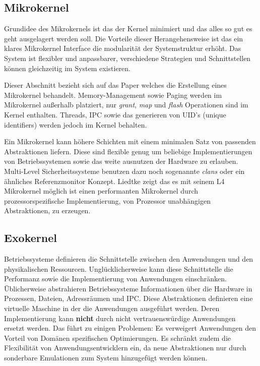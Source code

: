 \documentclass[11pt,technote]{IEEEtran}
\begin{document}
    \subsection{Mikrokernel}
	    Grundidee des Mikrokernels ist das der Kernel minimiert und das alles so gut es geht ausgelagert werden soll.
	    Die Vorteile dieser Herangehensweise ist das ein klares Mikrokernel Interface die modularit\"at der Systemstruktur erh\"oht.
	    Das System ist flexibler und anpassbarer, verschiedene Strategien und Schnittstellen k\"onnen gleichzeitig im System existieren.
	    
	    Dieser Abschnitt bezieht sich auf das Paper \cite{inproc:micro} welches die Erstellung eines Mikrokernel behandelt.
	    Memory-Management sowie Paging werden im Mikrokernel au\ss erhalb platziert, nur \textit{grant}, \textit{map} und \textit{flash} Operationen sind im Kernel 
	    enthalten. \cite[S. 238 f]{inproc:micro} Threads, IPC sowie das generieren von UID's (unique identifiers) werden jedoch im Kernel behalten.
	    
	    Ein Mikrokernel kann h\"ohere Schichten mit einem minimalen Satz von passenden Abstraktionen liefern.
	    Diese sind flexible genug um beliebige Implementierungen von Betriebssystemen sowie das weite ausnutzen der Hardware zu erlauben.
	    Multi-Level Sicherheitssysteme benutzen dazu noch sogenannte \textit{clans} oder ein \"ahnliches Referenzmonitor Konzept.        
	    Liedtke zeigt das es mit seinem L4 Mikrokernel m\"oglich ist einen performanten Mikrokernel durch prozessorspezifische Implementierung, 
	    von Prozessor unabh\"angigen Abstraktionen, zu erzeugen.\cite[S. 248]{inproc:micro}
   
    \subsection{Exokernel}       
      Betriebssysteme definieren die Schnittstelle zwischen den Anwendungen und den physikalischen Ressourcen.
      Ungl\"ucklicherweise kann diese Schnittstelle die Performanz sowie die Implementierung von Anwendungen einschr\"anken. \"Ublicherweise
      abstrahieren Betriebssysteme Informationen \"uber die Hardware in Prozessen, Dateien, Adressr\"aumen und IPC. Diese Abstraktionen definieren eine 
      virtuelle Maschine in der die Anwendungen ausgef\"uhrt werden. Deren Implementierung kann \textbf{nicht} durch nicht vertrauensw\"urdige Anwendungen
      ersetzt werden. Das f\"uhrt zu einigen Problemen: Es verweigert Anwendungen den Vorteil von Dom\"anen spezifischen Optimierungen.
      Es schr\"ankt zudem die Flexibilit\"at von Anwendungsentwicklern ein, da neue Abstraktionen nur durch sonderbare Emulationen zum
      System hinzugef\"ugt werden k\"onnen.
        
\end{document}
